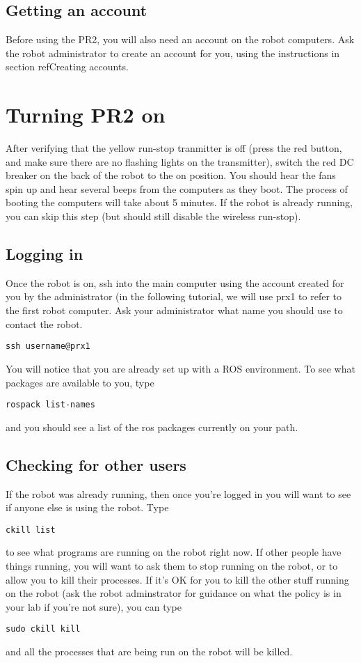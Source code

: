 \subsection{Getting an account}
Before using the PR2, you will also need an account on the robot computers.  Ask the robot administrator to create an account for you, using the instructions in section ref{Creating accounts}.
\section{Turning PR2 on}
After verifying that the yellow run-stop tranmitter is off (press the red button, and make sure there are no flashing lights on the transmitter), switch the red DC breaker on the back of the robot to the on position.  You should hear the fans spin up and hear several beeps from the computers as they boot.  The process of booting the computers will take about 5 minutes.  If the robot is already running, you can skip this step (but should still disable the wireless run-stop).
\subsection{Logging in}
Once the robot is on, ssh into the main computer using the account created for you by the administrator (in the following tutorial, we will use prx1 to refer to the first robot computer.  Ask your administrator what name you should use to contact the robot.
\begin{verbatim}
ssh username@prx1
\end{verbatim}
You will notice that you are already set up with a ROS environment.  To see what packages are available to you, type
\begin{verbatim}
rospack list-names
\end{verbatim}
and you should see a list of the ros packages currently on your path.

\subsection{Checking for other users}
If the robot was already running, then once you're logged in you will want to see if anyone else is using the robot.  Type
\begin{verbatim}
ckill list
\end{verbatim}
to see what programs are running on the robot right now.  If other people have things running, you will want to ask them to stop running on the robot, or to allow you to kill their processes.  If it's OK for you to kill the other stuff running on the robot (ask the robot adminstrator for guidance on what the policy is in your lab if you're not sure), you can type
\begin{verbatim}
sudo ckill kill
\end{verbatim}
and all the processes that are being run on the robot will be killed.
